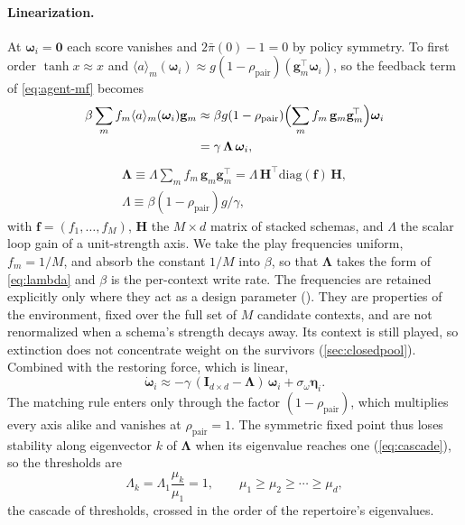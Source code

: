 \documentclass[
  aps,prx,
  reprint,
  superscriptaddress,
  nofootinbib,
  longbibliography
]{revtex4-2}
\newcommand{\w}{\bm{\omega}}
\newcommand{\g}{\mathbf{g}}
\newcommand{\Lam}{\bm{\Lambda}}
\newcommand{\Id}{\mathbf{I}}
\newcommand{\rhopair}{\rho_{\mathrm{pair}}}
\newcommand{\sidn}{\sigma_{\omega}}
\newcommand{\pibar}{\bar\pi}
\newcommand{\gain}{g}
\newcommand{\smref}[1]{\cite[Sec.~#1]{SM}}
\begin{document}
\paragraph{Linearization.} At $\w_i=\bm0$ each score vanishes and $2\pibar(0)-1=0$ by policy symmetry. To first order $\tanh x\approx x$ and $\langle a\rangle_m(\w_i)\approx \gain(1-\rhopair)(\g_m^{\!\top}\w_i)$, so the feedback term of \cref{eq:agent-mf} becomes
\begin{equation}
\begin{split}
\beta\sum_m f_m\langle a\rangle_m(\w_i)\g_m&\approx \beta\gain(1-\rhopair)\Bigl(\sum_m f_m\,\g_m\g_m^{\!\top}\Bigr)\w_i\\
&=\gamma\,\Lam\,\w_i,
\end{split}
\end{equation}
\begin{equation}
\begin{gathered}
\Lam\equiv \Lambda\sum_m f_m\,\g_m\g_m^{\!\top}=\Lambda\,\bm{H}^{\!\top}\mathrm{diag}(\mathbf{f})\,\bm{H},\\[2pt]
\Lambda\equiv\beta(1-\rhopair)\gain/\gamma,
\end{gathered}
\end{equation}
with $\mathbf{f}=(f_1,\ldots,f_M)$, $\bm{H}$ the $M\times d$ matrix of stacked schemas, and $\Lambda$ the scalar loop gain of a unit-strength axis. We take the play frequencies uniform, $f_m=1/M$, and absorb the constant $1/M$ into $\beta$, so that $\Lam$ takes the form of \cref{eq:lambda} and $\beta$ is the per-context write rate. The frequencies are retained explicitly only where they act as a design parameter (\smref{S2\,D}). They are properties of the environment, fixed over the full set of $M$ candidate contexts, and are not renormalized when a schema's strength decays away. Its context is still played, so extinction does not concentrate weight on the survivors (\cref{sec:closedpool}). Combined with the restoring force, which is linear,
\begin{equation}\label{eq:linear}
\dot{\w}_i\approx-\gamma\,(\Id_{d\times d}-\Lam)\,\w_i+\sidn\bm\eta_i.
\end{equation}
The matching rule enters only through the factor $(1-\rhopair)$, which multiplies every axis alike and vanishes at $\rhopair=1$. The symmetric fixed point thus loses stability along eigenvector $k$ of $\Lam$ when its eigenvalue reaches one (\cref{eq:cascade}), so the thresholds are
\begin{equation}\label{eq:thresholds}
\Lambda_k=\Lambda_1\frac{\mu_k}{\mu_1}=1,\qquad \mu_1\ge\mu_2\ge\cdots\ge\mu_d,
\end{equation}
the cascade of thresholds, crossed in the order of the repertoire's eigenvalues.
\end{document}
